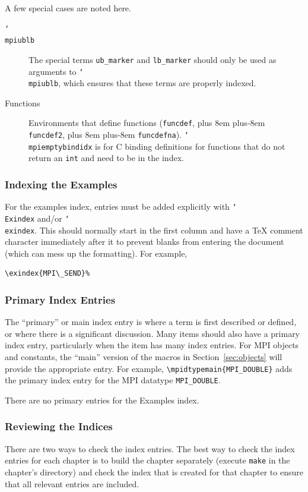 \documentclass[letterpaper,twoside,11pt,fleqn]{article}
\def\cmd#1{\texttt{\char`\\#1}}
\def\gb{\penalty10000\hskip 0pt plus 8em\penalty4800\hskip 0pt plus-8em%
\penalty10000}
\begin{document}
A few special cases are noted here.
\begin{description}
\item[\cmd{mpiublb}]The special terms \texttt{ub\_marker} and
  \texttt{lb\_marker} should only be used as arguments to
  \cmd{mpiublb}, which ensures that these terms are properly indexed.
\item[Functions]Environments that define functions (\texttt{funcdef},
  \gb\texttt{funcdef2}, \gb\texttt{funcdefna}).  \cmd{mpiemptybindidx} is
  for C binding definitions for functions that do not return an
  \texttt{int} and need to be in the index.
\end{description}

\subsubsection{Indexing the Examples}
For the examples index, entries must be added explicitly with \cmd{Exindex}
and/or \cmd{exindex}.
This should normally start in the first column and have a TeX comment
character immediately after it to prevent blanks from entering the
document (which can mess up the formatting).  For example,
\begin{verbatim}
\exindex{MPI\_SEND}%
\end{verbatim}

\subsubsection{Primary Index Entries}
The ``primary'' or main index entry is where a term is first described
or defined, or where there is a significant discussion.
Many items should also have a primary index entry, particularly when
the item has many index entries.
For MPI objects and constants, the ``main'' version of the macros in
Section~\ref{sec:objects} will provide the appropriate entry.
For example, \verb+\mpidtypemain{MPI_DOUBLE}+ adds the primary index
entry for the MPI datatype \verb+MPI_DOUBLE+.

There are no primary entries for the Examples index.

\subsubsection{Reviewing the Indices}
There are two ways to check the index entries.
The best way to check the index entries for each chapter is to build
the chapter separately (execute \texttt{make} in the chapter's directory) and
check the index that is created for that chapter to ensure that all
relevant entries are included.
\end{document}
